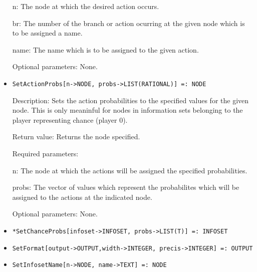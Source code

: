 \begin{itemize}
\bd
\item
[n:] The node at which the desired action occurs.
\item
[br:] The number of the branch or action ocurring at the given node
which is to be assigned a name.
\item
[name:] The name which is to be assigned to the given action.
\ed

\item
[Optional parameters:] None.

\ed

\item

\protect \large \begin{verbatim}
SetActionProbs[n->NODE, probs->LIST(RATIONAL)] =: NODE
\end{verbatim}\normalsize

\bd
\item
[Description:] Sets the action probabilities to the specified values
for the given node.  This is only meaninful for nodes in information
sets belonging to the player representing chance (player 0).
\item
[Return value:] Returns the node specified.
\item
[Required parameters:]\hfil\null
	
\bd
\item
[n:] The node at which the actions will be assigned the specified
probabilities.
\item
[probs:] The vector of values which represent the probabilites which
will be assigned to the actions at the indicated node.
\ed

\item
[Optional parameters:] None.
\ed

\item
\protect \large \begin{verbatim} 
*SetChanceProbs[infoset->INFOSET, probs->LIST(T)] =: INFOSET
\end{verbatim}\normalsize

\item
\protect \large \begin{verbatim}
SetFormat[output->OUTPUT,width->INTEGER, precis->INTEGER] =: OUTPUT
\end{verbatim}\normalsize

\item

\protect \large \begin{verbatim}
SetInfosetName[n->NODE, name->TEXT] =: NODE
\end{verbatim}\normalsize


\end{itemize}
